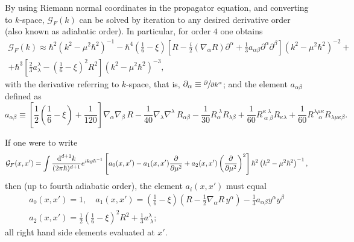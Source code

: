 By using Riemann normal coordinates in the propagator equation, and converting to $k$-space, $\mathcal{G}_F(k)$ can be solved by iteration to any desired derivative order (also known as adiabatic order). In particular, for order $4$ one obtains
\begin{multline}
	\mathcal{G}_F(k)\approx\hbar^2\left(k^2-\mu^2\hbar^2\right)^{-1}-\hbar^4\left(\frac{1}{6}-\xi\right)\left[R-\frac{i}{2}\left(\nabla_\alpha R\right)\partial^\alpha+\frac{1}{3}a_{\alpha\beta}\partial^\alpha\partial^\beta\right]\left(k^2-\mu^2\hbar^2\right)^{-2}+\\
	+\hbar^3\left[\frac{2}{3}a^\lambda_\lambda-\left(\frac{1}{6}-\xi\right)^2R^2\right]\left(k^2-\mu^2\hbar^2\right)^{-3},
\end{multline}
with the derivative referring to $k$-space, that is, $\partial_\alpha\equiv\sfrac{\partial }{\partial k^\alpha}$; and the element $a_{\alpha\beta}$ defined as
\begin{equation}
	a_{\alpha\beta}\equiv \left[\frac{1}{2}\left(\frac{1}{6}-\xi\right)+\frac{1}{120}\right]\nabla_\alpha\nabla_\beta\, R-\frac{1}{40}\nabla_\lambda\nabla^\lambda\,R_{\alpha\beta}-\frac{1}{30}R^{\;\lambda}_\alpha R_{\lambda\beta}+\frac{1}{60}R^{\kappa\;\lambda}_{\;\alpha\;\beta}R_{\kappa\lambda}+\frac{1}{60}R^{\lambda\mu\kappa}_{\;\;\;\alpha}R_{\lambda\mu\kappa\beta}.
\end{equation}

If one were to write
\begin{equation}\label{eq: g_F before integral}
	\mathcal{G}_F(x,x')=\int \frac{\text{d}^{d+1}k}{(2\pi\hbar)^{d+1}}e^{iky\hbar^{-1}}\left[a_0(x,x')-a_1(x,x')\frac{\partial}{\partial \mu^2}+a_2(x,x')\left(\frac{\partial}{\partial \mu^2}\right)^2\right]\hbar^2\left(k^2-\mu^2\hbar^2\right)^{-1},
\end{equation}
then (up to fourth adiabatic order), the element $a_i(x,x')$  must equal
\begin{subequations}
	\begin{gather}
		a_0(x,x')=1,\quad a_1(x,x')=\left(\frac{1}{6}-\xi\right)\left(R-\frac{1}{2}\nabla_\alpha R\,y^\alpha\right)-\frac{1}{3}a_{\alpha\beta} y^\alpha y^\beta\tag{\theequation \,\,a,b}\\
		a_2(x,x')=\frac{1}{2}\left(\frac{1}{6}-\xi\right)^2R^2+\frac{1}{3}a^\lambda_{\;\lambda}\tag{\theequation \,\,c};
	\end{gather}
\end{subequations}
all right hand side elements evaluated at $x'$.

